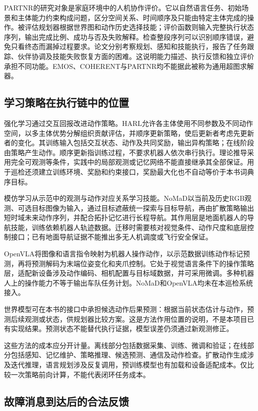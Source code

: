 PARTNR的研究对象是家庭环境中的人机协作评价\cite{PARTNR2025}。它以自然语言任务、初始场景和主体能力约束构成问题，区分空间关系、时间顺序及只能由特定主体完成的操作。被评估规划器根据世界图和动作历史选择技能；评价函数则输入完整执行状态序列，输出完成比例、成功与否及失败解释。检查整段序列可以识别顺序错误，避免只看终态而漏掉过程要求。论文分别考察规划、感知和技能执行，报告了任务跟踪、伙伴协调及技能失败恢复方面的困难。这说明能力描述、执行反馈和独立评价承担不同功能。EMOS、COHERENT与PARTNR均不能据此被称为通用超图求解器。

\subsection{学习策略在执行链中的位置}

强化学习通过交互回报改进动作策略。HARL允许各主体使用不同参数及不同动作空间，以多主体优势分解组织贡献评估，并顺序更新策略，使后更新者考虑先更新者的变化\cite{HARL2024}。其训练输入包括交互状态、动作及共同奖励，输出异构策略；在线阶段由策略产生动作。顺序更新指训练过程，不要求机器人依次串行执行。理论推导采用完全可观测等条件，实践中的局部观测或记忆网络不能直接继承其全部保证。用于巡检还须建立训练环境、奖励和约束接口，奖励最大化也不自动等价于本书词典序目标。

模仿学习从示范中的观测与动作对应关系学习技能。NoMaD以当前及历史RGB观测、可选目标图像为输入，通过目标遮蔽统一探索与目标导航，再由扩散策略输出短时域未来动作序列，并配合拓扑记忆进行长程导航\cite{NoMaD2024}。其作用层是地面机器人的导航技能，训练依赖机器人轨迹数据。迁移时需要核对视觉条件、动作尺度和底层控制接口；已有地面导航证据不能推出多无人机调度或飞行安全保证。

OpenVLA将图像和语言指令映射为机器人操作动作，以示范数据训练动作标记预测，再将预测解码为末端位姿变化和夹爪控制\cite{OpenVLA2024}。它处于视觉语言条件下的操作策略层，适配新设备涉及动作编码、相机配置与目标域数据，并可采用微调。多种机器人上的操作能力不等于输出车队任务计划。NoMaD和OpenVLA均未在本巡检系统接入。

世界模型可在本书的接口中承担候选动作后果预测：根据当前状态估计与动作，预测后续观测或状态，供规划器比较方案。这是方法作用位置的说明，不是本项目已有实现结果。预测状态不能替代执行证据，模型误差仍须通过新观测修正。

这些方法的成本应分开计量。离线部分包括数据采集、训练、微调和验证；在线部分包括感知、记忆维护、策略推理、候选预测、通信及动作检查。扩散动作生成涉及迭代推理，语言规划涉及反复调用，预训练模型也有加载和设备适配成本。仅比较一次策略前向计算，不能代表闭环任务成本。

\subsection{故障消息到达后的合法反馈}

